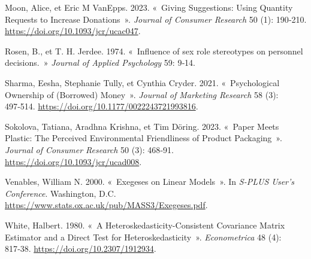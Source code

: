 \documentclass[
  11pt,
  letterpaper,
]{scrbook}
\newlength{\cslhangindent}
\newenvironment{CSLReferences}[2] %
 {\begin{list}{}{%
  \setlength{\itemindent}{0pt}
  \setlength{\leftmargin}{0pt}
  \setlength{\parsep}{0pt}
  \ifodd #1
   \setlength{\leftmargin}{\cslhangindent}
   \setlength{\itemindent}{-1\cslhangindent}
  \fi
  \setlength{\itemsep}{#2\baselineskip}}}
 {\end{list}}
\theoremstyle{definition}
\theoremstyle{plain}
\theoremstyle{definition}
\theoremstyle{plain}
\theoremstyle{remark}
\begin{document}
\begin{CSLReferences}{1}{0}
Moon, Alice, et Eric M VanEpps. 2023. {«~Giving Suggestions: Using
Quantity Requests to Increase Donations~»}. \emph{Journal of Consumer
Research} 50 (1): 190‑210. \url{https://doi.org/10.1093/jcr/ucac047}.

Rosen, B., et T. H. Jerdee. 1974. {«~Influence of sex role stereotypes
on personnel decisions.~»} \emph{Journal of Applied Psychology} 59:
9‑14.

Sharma, Eesha, Stephanie Tully, et Cynthia Cryder. 2021.
{«~Psychological Ownership of (Borrowed) Money~»}. \emph{Journal of
Marketing Research} 58 (3): 497‑514.
\url{https://doi.org/10.1177/0022243721993816}.

Sokolova, Tatiana, Aradhna Krishna, et Tim Döring. 2023. {«~Paper Meets
Plastic: The Perceived Environmental Friendliness of Product
Packaging~»}. \emph{Journal of Consumer Research} 50 (3): 468‑91.
\url{https://doi.org/10.1093/jcr/ucad008}.

Venables, William N. 2000. {«~Exegeses on Linear Models~»}. In
\emph{S-PLUS User's Conference}. Washington, D.C.
\url{https://www.stats.ox.ac.uk/pub/MASS3/Exegeses.pdf}.

White, Halbert. 1980. {«~A Heteroskedasticity-Consistent Covariance
Matrix Estimator and a Direct Test for Heteroskedasticity~»}.
\emph{Econometrica} 48 (4): 817‑38.
\url{https://doi.org/10.2307/1912934}.

\end{CSLReferences}


\backmatter
\end{document}
